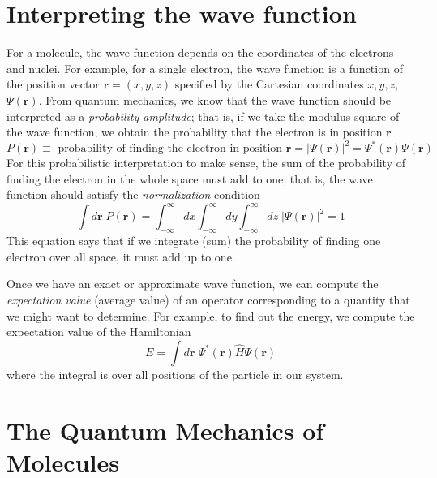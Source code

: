 \documentclass[../Main/notes.tex]{subfiles}
\begin{document}
\section{Interpreting the wave function}

For a molecule, the wave function depends on the coordinates of the electrons and nuclei.
For example, for a single electron, the wave function is a function of the position vector $\mathbf{r} = (x,y,z)$ specified by the Cartesian coordinates $x,y,z$, $\Psi(\mathbf{r})$.
From quantum mechanics, we know that the wave function should be interpreted as a \emph{probability amplitude}; that is, if we take the modulus square of the wave function, we obtain the probability that the electron is in position $\mathbf{r}$
\begin{equation}
P(\mathbf{r}) \equiv \text{ probability of finding the electron in position } \mathbf{r} = |\Psi(\mathbf{r})|^2  = \Psi^*(\mathbf{r}) \Psi(\mathbf{r}) 
\end{equation}
For this probabilistic interpretation to make sense, the sum of the probability of finding the electron in the whole space must add to one; that is, the wave function should satisfy the \emph{normalization} condition
\begin{equation}
\int  d\mathbf{r} \; P(\mathbf{r}) =  \int _{-\infty}^{\infty} dx \int _{-\infty}^{\infty} dy \int _{-\infty}^{\infty} dz \; |\Psi(\mathbf{r})|^2   = 1
\end{equation}
This equation says that if we integrate (sum) the probability of finding one electron over all space, it must add up to one.

Once we have an exact or approximate wave function, we can compute the \emph{expectation value} (average value) of an operator corresponding to a quantity that we might want to determine.
For example, to find out the energy, we compute the expectation value of the Hamiltonian
\begin{equation}
E = \int d\mathbf{r} \; \Psi^*(\mathbf{r}) \hat{H} \Psi(\mathbf{r})
\end{equation}
where the integral is over all positions of the particle in our system.


\section{The Quantum Mechanics of Molecules}
\end{document}
